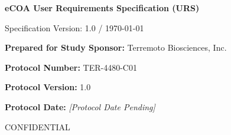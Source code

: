 
\thispagestyle{empty}

\vspace*{2cm}

\begin{center}
  {\Huge\bfseries eCOA User Requirements Specification (URS)\par}
  \vspace{1.5cm}
  {\Large Specification Version: 1.0 / \today\par}
\end{center}

\vspace{4cm}

\noindent\textbf{Prepared for Study Sponsor:} Terremoto Biosciences, Inc.\par
\vspace{0.5em}
\noindent\textbf{Protocol Number:} TER-4480-C01\par
\vspace{0.5em}
\noindent\textbf{Protocol Version:} 1.0\par
\vspace{0.5em}
\noindent\textbf{Protocol Date:} \textit{[Protocol Date Pending]}\par

\vfill

\begin{center}
  \small CONFIDENTIAL\par
\end{center}
